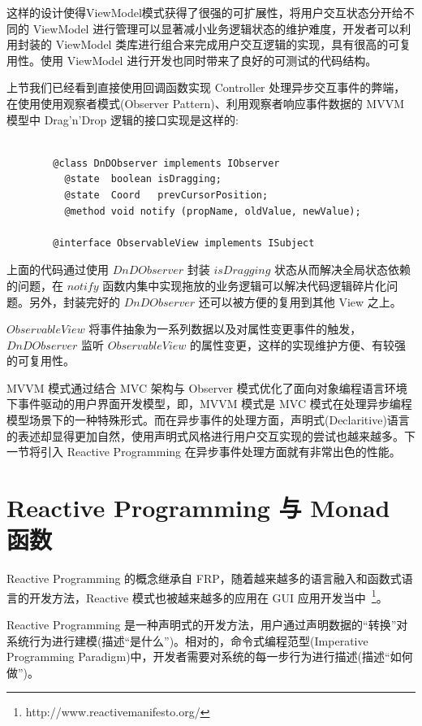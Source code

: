 这样的设计使得ViewModel模式获得了很强的可扩展性，将用户交互状态分开给不同的 ViewModel 进行管理可以显著减小业务逻辑状态的维护难度，开发者可以利用封装的 ViewModel 类库进行组合来完成用户交互逻辑的实现，具有很高的可复用性。使用 ViewModel 进行开发也同时带来了良好的可测试的代码结构。

上节我们已经看到直接使用回调函数实现 Controller 处理异步交互事件的弊端，在使用使用观察者模式(Observer Pattern)、利用观察者响应事件数据的 MVVM 模型中 Drag'n'Drop 逻辑的接口实现是这样的:

\begin{verbatim}

        @class DnDObserver implements IObserver
          @state  boolean isDragging;
          @state  Coord   prevCursorPosition;
          @method void notify (propName, oldValue, newValue);

        @interface ObservableView implements ISubject

\end{verbatim}

上面的代码通过使用 $DnDObserver$ 封装 $isDragging$ 状态从而解决全局状态依赖的问题，在 $notify$ 函数内集中实现拖放的业务逻辑可以解决代码逻辑碎片化问题。另外，封装完好的 $DnDObserver$ 还可以被方便的复用到其他 View 之上。

$ObservableView$ 将事件抽象为一系列数据以及对属性变更事件的触发，$DnDObserver$ 监听 $ObservableView$ 的属性变更，这样的实现维护方便、有较强的可复用性。

MVVM 模式通过结合 MVC 架构与 Observer 模式优化了面向对象编程语言环境下事件驱动的用户界面开发模型，即，MVVM 模式是 MVC 模式在处理异步编程模型场景下的一种特殊形式。而在异步事件的处理方面，声明式(Declaritive)语言的表述却显得更加自然，使用声明式风格进行用户交互实现的尝试也越来越多。下一节将引入 Reactive Programming 在异步事件处理方面就有非常出色的性能。

\section{Reactive Programming 与 Monad 函数}

Reactive Programming 的概念继承自 FRP，随着越来越多的语言融入和函数式语言的开发方法，Reactive 模式也被越来越多的应用在 GUI 应用开发当中~\footnote{http://www.reactivemanifesto.org/}。

Reactive Programming 是一种声明式的开发方法，用户通过声明数据的“转换”对系统行为进行建模(描述“是什么”)。相对的，命令式编程范型(Imperative Programming Paradigm)中，开发者需要对系统的每一步行为进行描述(描述“如何做”)。

